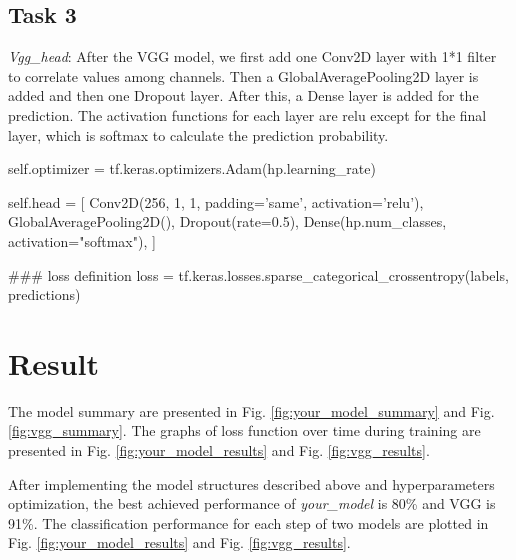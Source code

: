 \subsection*{Task 3}

\emph{Vgg\_head}: After the VGG model, we first add one Conv2D layer with 1*1 filter to correlate values among channels. Then a GlobalAveragePooling2D layer is added and then one Dropout layer. After this, a Dense layer is added for the prediction. The activation functions for each layer are relu except for the final layer, which is softmax to calculate the prediction probability.
    \begin{python}
self.optimizer = tf.keras.optimizers.Adam(hp.learning_rate)

self.head = [
    Conv2D(256, 1, 1, padding='same', activation='relu'),
    GlobalAveragePooling2D(),
    Dropout(rate=0.5),
    Dense(hp.num_classes, activation="softmax"),
  ]
  
### loss definition
loss = tf.keras.losses.sparse_categorical_crossentropy(labels, predictions)
    \end{python}

\section*{Result}

The model summary are presented in Fig. \ref{fig:your_model_summary} and Fig. \ref{fig:vgg_summary}. The graphs of loss function over time during training are presented in Fig. \ref{fig:your_model_results} and Fig. \ref{fig:vgg_results}.

After implementing the model structures described above and hyperparameters optimization, the best achieved performance of \emph{your\_model} is 80\% and VGG is 91\%. The classification performance for each step of two models are plotted in Fig. \ref{fig:your_model_results} and Fig. \ref{fig:vgg_results}.

